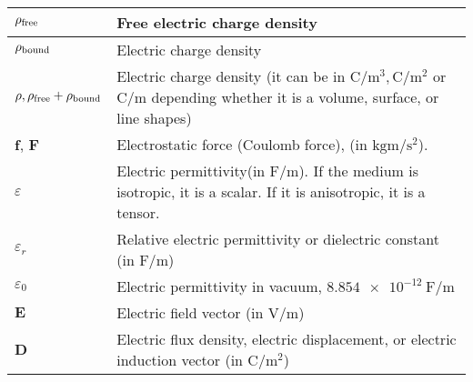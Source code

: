 \begin{xltabular}{\textwidth}{XX}
	\(\rho_{\textnormal{free}}\)                                 & Free electric charge density                                                                                                                                                             \\ \hline
	\(\rho_{\textnormal{bound}}\)                                & Electric charge density                                                                                                                                                                  \\ \hline
	\(\rho, \rho_{\textnormal{free}}+\rho_{\textnormal{bound}}\) & Electric charge density (it can be in \(\si{\coulomb\per\meter^3}, \si{\coulomb\per\meter^2}\) or \(\si{\coulomb\per\meter}\) depending whether it is a volume, surface, or line shapes) \\ \hline
	\(\mathbf{f}\)\cite{ramoFieldsWavesCommunication1994}, \(\mathbf{F}\)\cite{wiki:coulomb-law}                                               & Electrostatic force (Coulomb force), (in \(\si{\kilo\gram\meter\per\second\squared}\)).                   \\ \hline
	\(\varepsilon\)                                              & Electric permittivity(in \(\si{\farad\per\meter}\)). If the medium is isotropic, it is a scalar. If it is anisotropic, it is a tensor. \cite{ramoFieldsWavesCommunication1994}           \\ \hline
	\(\varepsilon_r\)                                            & Relative electric permittivity or dielectric constant (in \(\si{\farad\per\meter}\)) \cite{ramoFieldsWavesCommunication1994}                                                             \\ \hline
	\(\varepsilon_0\)                                            & Electric permittivity in vacuum, \(\SI{8.854e-12}{\farad\per\meter}\) \cite{ramoFieldsWavesCommunication1994}                                                                            \\ \hline
	\(\mathbf{E}\)                                               & Electric field vector (in \(\si{\volt\per\meter}\))                                                                                                                                      \\ \hline
	\(\mathbf{D}\)                                               & Electric flux density, electric displacement, or electric induction vector (in \(\si{\coulomb\per\meter\squared}\))                                                                      \\ \hline

\end{xltabular}
